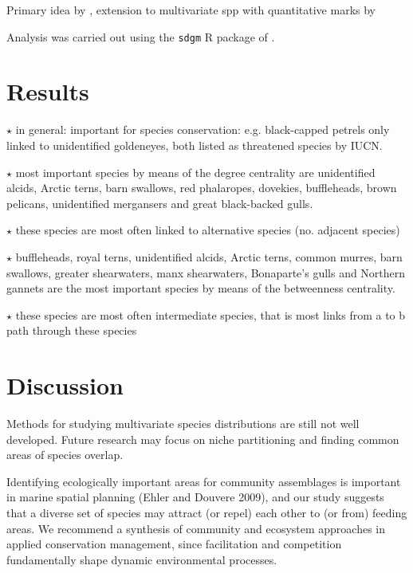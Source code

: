 \documentclass{statsoc}
\begin{document}
Primary idea by \cite{Eckardt2016}, extension to multivariate spp with quantitative marks by \cite{Eckardt2016b}

Analysis was carried out using the \texttt{sdgm} R package of \cite{Eckardt2016a}.

\section{Results}

$\star$ in general: important for species conservation: e.g. black-capped petrels only linked to unidentified goldeneyes, both listed as threatened species by IUCN. 


$\star$ most important species by means of the degree centrality are unidentified alcids, Arctic terns, barn swallows, red phalaropes, dovekies, buffleheads, brown pelicans, unidentified mergansers and great black-backed gulls.


$\star$ these species are most often linked to alternative species (no. adjacent species)


$\star$ buffleheads, royal terns, unidentified alcids, Arctic terns, common murres, barn swallows, greater shearwaters, manx shearwaters, Bonaparte's gulls and Northern gannets are the most important species by means of the betweenness centrality.


$\star$ these species are most often intermediate species, that is most links from a to b path through these species



\section{Discussion}

Methods for studying multivariate species distributions are still not well developed. Future research may focus on niche partitioning and finding common areas of species overlap.

Identifying ecologically important areas for community assemblages is important in marine spatial planning (Ehler and Douvere 2009), and our study suggests that a diverse set of species may attract (or repel) each other to (or from) feeding areas. We recommend a synthesis of community and ecosystem approaches in applied conservation management, since facilitation and competition fundamentally shape dynamic environmental processes.





\end{document}
